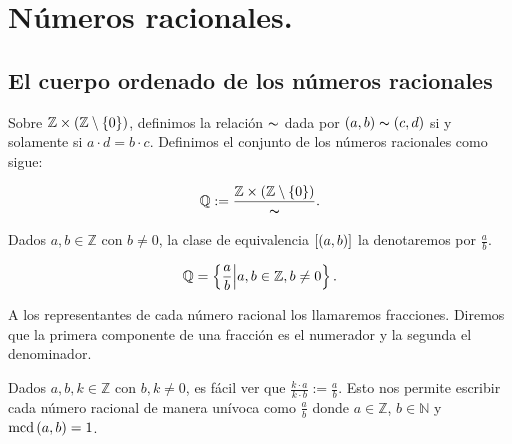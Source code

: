 \chapter{Números racionales.}
\section{El cuerpo ordenado de los números racionales}

Sobre $\mathbb{Z}\times\left(\mathbb{Z}\setminus\left\{0\right\}\right)$, definimos la relación $\thicksim$ dada por $\left(a,b\right)\thicksim\left(c,d\right)$ si y solamente si $a\cdot d=b\cdot c$. Definimos el conjunto de los números racionales como sigue:

\begin{equation}
    \mathbb{Q}:=\frac{\mathbb{Z}\times\left(\mathbb{Z}\setminus\left\{0\right\}\right)}{\thicksim}.
\end{equation}

Dados $a,b\in\mathbb{Z}$ con $b\neq 0$, la clase de equivalencia $\left[\left(a,b\right)\right]$ la denotaremos por $\displaystyle\frac{a}{b}$. 

\begin{equation}
    \mathbb{Q}=\left\{\frac{a}{b}\middle|a,b\in\mathbb{Z},b\neq 0\right\}.
\end{equation}

A los representantes de cada número racional los llamaremos fracciones. Diremos que la primera componente de una fracción es el numerador y la segunda el denominador.

Dados $a,b,k\in\mathbb{Z}$ con $b,k\neq 0$, es fácil ver que $\displaystyle\frac{k\cdot a}{k\cdot b}:=\frac{a}{b}$. Esto nos permite escribir cada número racional de manera unívoca como $\displaystyle\frac{a}{b}$ donde $a\in\mathbb{Z}$, $b\in\mathbb{N}$ y $\text{mcd}\left(a,b\right)=1$.

